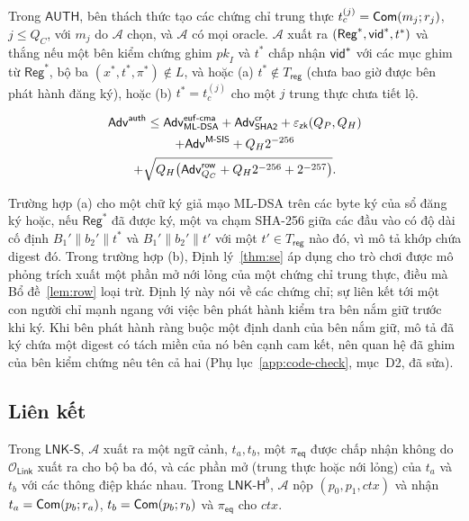 \begin{definition}
\label{def:auth}
Trong $\mathsf{AUTH}$, bên thách thức tạo các chứng chỉ trung thực
$t_c^{(j)}=\mathsf{Com}(m_j;r_j)$, $j\le Q_C$, với $m_j$ do $\mathcal A$ chọn, và
$\mathcal A$ có mọi oracle. $\mathcal A$ xuất ra $(\mathsf{Reg}^*,\mathsf{vid}^*,t^*)$
và thắng nếu một bên kiểm chứng ghim $\mathit{pk}_I$ và $t^*$ chấp nhận $\mathsf{vid}^*$
với các mục ghim từ $\mathsf{Reg}^*$, bộ ba $(x^*,t^*,\pi^*)\notin L$, và hoặc
(a) $t^*\notin T_{\mathsf{reg}}$ (chưa bao giờ được bên phát hành đăng ký), hoặc
(b) $t^*=t_c^{(j)}$ cho một $j$ trung thực chưa tiết lộ.
\end{definition}

\begin{theorem}
\label{thm:auth}
\begin{multline*}
\mathsf{Adv}^{\mathsf{auth}}\le\mathsf{Adv}^{\mathsf{euf\text{-}cma}}_{\mathsf{ML\text{-}DSA}}
+\mathsf{Adv}^{\mathsf{cr}}_{\mathsf{SHA2}}+\varepsilon_{\mathsf{zk}}(Q_P,Q_H)\\
+\mathsf{Adv}^{\textsf{M-SIS}}+Q_H2^{-256}\\
+\sqrt{Q_H\bigl(\mathsf{Adv}^{\mathsf{row}}_{Q_C}+Q_H2^{-256}+2^{-257}\bigr)}.
\end{multline*}
\end{theorem}
\noindent
Trường hợp (a) cho một chữ ký giả mạo ML-DSA trên các byte ký của sổ đăng ký
hoặc, nếu $\mathsf{Reg}^*$ đã được ký, một va chạm SHA-256 giữa các đầu vào có
độ dài cố định $B_1'\|b_2'\|t^*$ và $B_1'\|b_2'\|t'$ với một
$t'\in T_{\mathsf{reg}}$ nào đó, vì mô tả khớp chứa digest đó. Trong trường hợp
(b), Định lý~\ref{thm:se} áp dụng cho trò chơi được mô phỏng trích xuất một phần
mở nới lỏng của một chứng chỉ trung thực, điều mà Bổ đề~\ref{lem:row} loại trừ.
Định lý này nói về các chứng chỉ; sự liên kết tới một con người chỉ mạnh ngang
với việc bên phát hành kiểm tra bên nắm giữ trước khi ký. Khi bên phát hành ràng
buộc một định danh của bên nắm giữ, mô tả đã ký chứa một digest có tách miền của
nó bên cạnh cam kết, nên quan hệ đã ghim của bên kiểm chứng nêu tên cả hai
(Phụ lục~\ref{app:code-check}, mục~D2, đã sửa).

\subsection{Liên kết}
\label{sec:sec-linkage}

\begin{definition}
\label{def:link}
Trong $\mathsf{LNK\text{-}S}$, $\mathcal A$ xuất ra một ngữ cảnh, $t_a,t_b$, một
$\pi_{\mathsf{eq}}$ được chấp nhận không do $\mathcal O_{\mathsf{Link}}$ xuất ra
cho bộ ba đó, và các phần mở (trung thực hoặc nới lỏng) của $t_a$ và $t_b$ với
các thông điệp khác nhau. Trong $\mathsf{LNK\text{-}H}^b$, $\mathcal A$ nộp
$(p_0,p_1,\mathit{ctx})$ và nhận $t_a=\mathsf{Com}(p_b;r_a)$,
$t_b=\mathsf{Com}(p_b;r_b)$ và $\pi_{\mathsf{eq}}$ cho $\mathit{ctx}$.
\end{definition}


